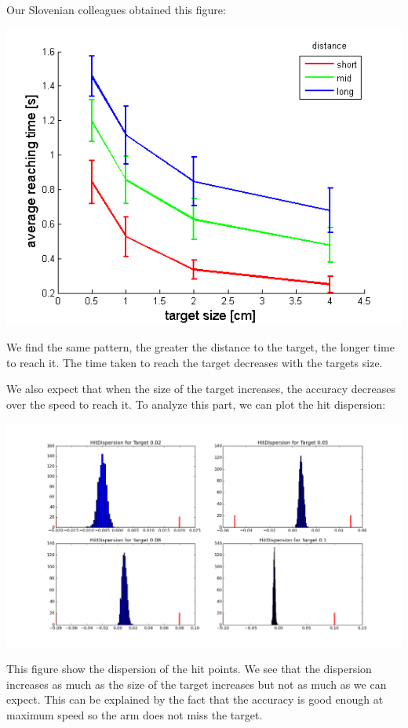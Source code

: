 \documentclass[pdftex,a4paper,12pt]{report}
\begin{document}
Our Slovenian colleagues obtained this figure:
\begin{center}
\includegraphics[scale=0.7]{figures/timeLuka.png}
\end{center}
We find the same pattern, the greater the distance to the target, the longer time to reach it. The time taken to reach the target decreases with the targets size.


We also expect that when the size of the target increases, the accuracy decreases over the speed to reach it.
To analyze this part, we can plot the hit dispersion:
\begin{center}
\includegraphics[scale=0.3]{figures/hitDispAll0p1_0p4175.png}
\end{center}
This figure show the dispersion of the hit points. We see that the dispersion increases as much as the size of the target increases but not as much as we can expect.
This can be explained by the fact that the accuracy is good enough at maximum speed so the arm does not miss the target.
\end{document}

